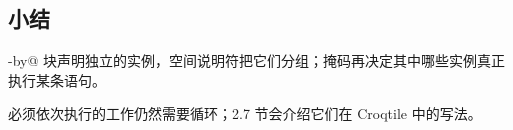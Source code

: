\subsection*{小结}

\co@parallel-by@ 块声明独立的实例，空间说明符把它们分组；掩码再决定其中哪些实例真正执行某条语句。

必须依次执行的工作仍然需要循环；2.7 节会介绍它们在 Croqtile 中的写法。
